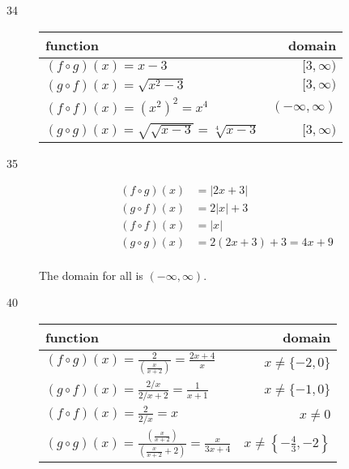 \documentclass{exam}
\begin{document}
\begin{description}
    \item[34]
      \begin{tabular}{lr}
        \toprule
        function                                                 & domain \\
        \midrule
        $(f \circ g)(x) = x - 3$                                 & $[3, \infty)$ \\
        \midrule
        $(g \circ f)(x) = \sqrt{x^2 - 3}$                        & $[3, \infty)$ \\
        \midrule
        $(f \circ f)(x) = (x^2)^2 = x^4$                         & $(-\infty, \infty)$ \\
        \midrule
        $(g \circ g)(x) = \sqrt{\sqrt{x - 3}} = \sqrt[4]{x - 3}$ & $[3, \infty)$ \\
        \bottomrule
      \end{tabular}

    \item[35]
      \begin{align*}
        (f \circ g)(x) &= |2x + 3| \\
        (g \circ f)(x) &= 2 |x| + 3 \\
        (f \circ f)(x) &= |x| \\
        (g \circ g)(x) &= 2(2x + 3) + 3 = 4x + 9 \\
      \end{align*}

      The domain for all is $(-\infty, \infty)$.

    \item[40]
      \begin{tabular}{lr}
        \toprule
        function                                                                        & domain \\
        \midrule
        $(f \circ g)(x) = \frac{2}{\left( \frac{x}{x + 2} \right)} = \frac{2x + 4}{x}$ & $x \neq \{-2, 0\}$ \\
        \midrule
        $(g \circ f)(x) = \frac{2/x}{2/x + 2} = \frac{1}{x + 1}$                       & $x \neq \{-1, 0\}$ \\
        \midrule
        $(f \circ f)(x) = \frac{2}{2/x} = x$                                           & $x \neq 0$ \\
        \midrule
        $(g \circ g)(x) = \frac{\left( \frac{x}{x + 2} \right)}{\left( \frac{x}{x + 2} + 2 \right)} = \frac{x}{3x + 4}$ 
            & $x \neq \left\{ -\frac{4}{3}, -2 \right\}$ \\
        \bottomrule
      \end{tabular}


\end{description}
\end{document}
